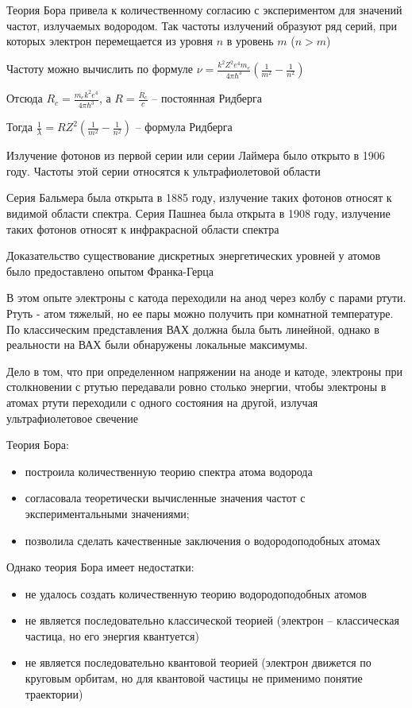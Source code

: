 \mediumvspace

Теория Бора привела к количественному согласию с экспериментом для значений частот, излучаемых водородом. Так частоты излучений образуют ряд серий, при которых электрон перемещается из уровня $n$ в уровень $m$ ($n > m$)

Частоту можно вычислить по формуле $\nu = \frac{k^2 Z^2 e^4 m_e}{4 \pi \hbar^3} \left(\frac{1}{m^2} - \frac{1}{n^2}\right)$

Отсюда $R_c = \frac{m_e k^2 e^4}{4 \pi \hbar^3}$, а $R = \frac{R_c}{c}$ -- постоянная Ридберга

Тогда $\frac{1}{\lambda} = R Z^2 \left(\frac{1}{m^2} - \frac{1}{n^2}\right)$ -- формула Ридберга

Излучение фотонов из первой серии или серии Лаймера было открыто в 1906 году. Частоты этой серии относятся к ультрафиолетовой области

Серия Бальмера была открыта в 1885 году, излучение таких фотонов относят к видимой области спектра. Серия Пашнеа была открыта в 1908 году, излучение таких фотонов относят к инфракрасной области спектра

\mediumvspace

Доказательство существование дискретных энергетических уровней у атомов было предоставлено опытом Франка-Герца

В этом опыте электроны с катода переходили на анод через колбу с парами ртути. Ртуть - атом тяжелый, но ее пары можно получить при комнатной температуре. По классическим представления ВАХ должна была быть линейной, однако в реальности на ВАХ были обнаружены локальные максимумы. 

Дело в том, что при определенном напряжении на аноде и катоде, электроны при столкновении с ртутью передавали ровно столько энергии, чтобы электроны в атомах ртути переходили с одного состояния на другой, излучая ультрафиолетовое свечение

\mediumvspace

Теория Бора:

\begin{itemize}
    \item построила количественную теорию спектра атома водорода
    \item согласовала теоретически вычисленные значения частот с экспериментальными значениями;
    \item позволила сделать качественные заключения о водородоподобных атомах
\end{itemize}

Однако теория Бора имеет недостатки:

\begin{itemize}
    \item не удалось создать количественную теорию водородоподобных атомов
    \item не является последовательно классической теорией (электрон -- классическая частица, но его энергия квантуется)
    \item не является последовательно квантовой теорией (электрон движется по круговым орбитам, но для квантовой частицы не применимо понятие траектории)
\end{itemize}

